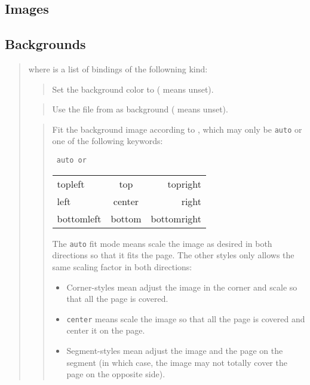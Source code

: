 \documentclass[12pt]{article}
\begin{document}
\subsection {Images}

\subsection {Backgrounds}

\medskip\noindent
\docdef \advibg \doctt {[global]}
\begin{quote}
where  is a list of bindings of the followning kind:

\begin{quote}
Set the background color to 
( means unset).
\end{quote}

\begin{quote}
Use the file from  as background
( means unset).
\end{quote}

\begin{quote}
Fit the background image according to , which may only be 
{\tt auto} or one of the following keywords:
\begin{center}
\tt
auto \hfill {\rm or} \hfill
\begin{tabular}{l@{\qquad}c@{\qquad}r}
topleft&   top& topright\\
left&  center&  right \\
bottomleft& bottom & bottomright\\
\end{tabular}
\end{center}
The {\tt auto} fit mode means scale the image as desired in both directions
so that it fits the page. The other styles only allows the same scaling
factor in both directions:
\begin {itemize}

\item
Corner-styles mean adjust the image in the corner
and scale so that all the page is covered. 

\item
{\tt center} means scale the
image so that all the page is covered and center it on the page. 

\item
Segment-styles mean adjust the image and the page on the segment (in which
case, the image may not totally cover the page on the opposite side). 


\end{itemize}
\end{quote}
\end{quote}
\end{document}
